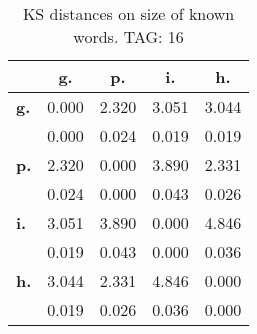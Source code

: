 \begin{table}[h!]
\begin{center}
\begin{tabular}{| l || c | c | c | c |}\hline
 & {\bf g.} & {\bf p.} & {\bf i.} & {\bf h.} \\\hline\hline
{\bf g.} & 0.000 & 2.320 & 3.051 & 3.044 \\
{\bf } & 0.000 & 0.024 & 0.019 & 0.019 \\\hline
{\bf p.} & 2.320 & 0.000 & 3.890 & 2.331 \\
{\bf } & 0.024 & 0.000 & 0.043 & 0.026 \\\hline
{\bf i.} & 3.051 & 3.890 & 0.000 & 4.846 \\
{\bf } & 0.019 & 0.043 & 0.000 & 0.036 \\\hline
{\bf h.} & 3.044 & 2.331 & 4.846 & 0.000 \\
{\bf } & 0.019 & 0.026 & 0.036 & 0.000 \\\hline
\end{tabular}
\caption{KS distances on size of known words. TAG: 16}
\end{center}
\end{table}
